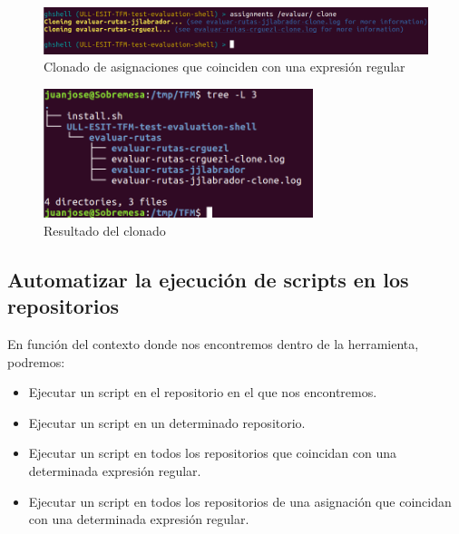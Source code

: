         \begin{figure}[H]
		\begin{center}
		\includegraphics[width=1\textwidth]{images/ghshell6-1}
		\caption{Clonado de asignaciones que coinciden con una expresión regular}
		\label{fig:ghshell6-1}
		\end{center}
		\end{figure}	
		
		\begin{figure}[H]
		\begin{center}
		\includegraphics[width=0.7\textwidth]{images/ghshell6-2}
		\caption{Resultado del clonado}
		\label{fig:ghshell6-2}
		\end{center}
		\end{figure}

\newpage
\subsection{Automatizar la ejecución de scripts en los repositorios}
\label{subsec:3.1.3} 
	    
    En función del contexto donde nos encontremos dentro de la herramienta, podremos:
    \begin{itemize}
    	\item Ejecutar un script en el repositorio en el que nos encontremos.
    	\item Ejecutar un script en un determinado repositorio.
	    \item Ejecutar un script en todos los repositorios que coincidan con una determinada expresión regular.
	    \item Ejecutar un script en todos los repositorios de una asignación que coincidan con una determinada expresión regular.
    \end{itemize}
    
